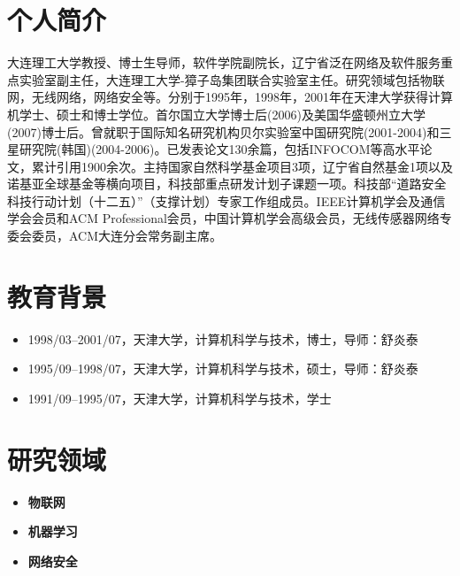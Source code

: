 \documentclass{resume}
\begin{document}


 
\section{个人简介}
\hspace{20pt} 大连理工大学教授、博士生导师，软件学院副院长，辽宁省泛在网络及软件服务重点实验室副主任，大连理工大学-獐子岛集团联合实验室主任。研究领域包括物联网，无线网络，网络安全等。分别于1995年，1998年，2001年在天津大学获得计算机学士、硕士和博士学位。首尔国立大学博士后(2006)及美国华盛顿州立大学(2007)博士后。曾就职于国际知名研究机构贝尔实验室中国研究院(2001-2004)和三星研究院(韩国)(2004-2006)。已发表论文130余篇，包括INFOCOM等高水平论文，累计引用1900余次。主持国家自然科学基金项目3项，辽宁省自然基金1项以及诺基亚全球基金等横向项目，科技部重点研发计划子课题一项。科技部“道路安全科技行动计划（十二五）”（支撑计划）专家工作组成员。IEEE计算机学会及通信学会会员和ACM Professional会员，中国计算机学会高级会员，无线传感器网络专委会委员，ACM大连分会常务副主席。

\section{教育背景}
\begin{itemize}[parsep=0.2ex]
\item 1998/03--2001/07，天津大学，计算机科学与技术，博士，导师：舒炎泰
\item 1995/09--1998/07，天津大学，计算机科学与技术，硕士，导师：舒炎泰
\item 1991/09--1995/07，天津大学，计算机科学与技术，学士
\end{itemize}

\section{研究领域}
\begin{itemize}[parsep=0.2ex]
  \item \textbf{物联网}
  \item \textbf{机器学习}
  \item \textbf{网络安全}
\end{itemize}
\end{document}
